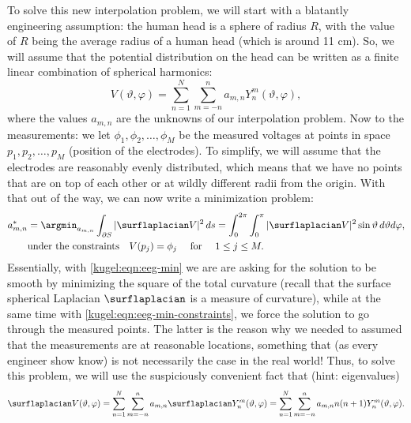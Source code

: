 To solve this new interpolation problem, we will start with a blatantly
engineering assumption: the human head is a sphere of radius $R$, with the value
of $R$ being the average radius of a human head (which is around 11 cm). So, we
will assume that the potential distribution on the head can be written as a
finite linear combination of spherical harmonics:
\begin{equation*}
  V(\vartheta, \varphi)
    = \sum_{n=1}^N \sum_{m=-n}^n a_{m,n} Y^m_n(\vartheta, \varphi),
\end{equation*}
where the values $a_{m,n}$ are the unknowns of our interpolation problem. Now to
the measurements: we let $\phi_1, \phi_2, \ldots, \phi_M$ be the measured voltages
at points in space $p_1, p_2, \ldots, p_M$ (position of the electrodes). To
simplify, we will assume that the electrodes are reasonably evenly distributed,
which means that we have no points that are on top of each other or at wildly
different radii from the origin. With that out of the way, we can now write a
minimization problem:
\begin{subequations}
  \begin{align}
    a_{m,n}^* &= \argmin_{a_{m,n}}
      \int_{\partial S} | \surflaplacian V |^2 \, ds 
      = \int_0^{2\pi} \int_{0}^\pi | \surflaplacian V |^2
        \sin \vartheta \, d\vartheta d\varphi, 
        \label{kugel:eqn:eeg-min} \\
    &\text{under the constraints} \quad V(p_j) = \phi_j
      \quad \text{ for } \quad 1 \leq j \leq M.
      \label{kugel:eqn:eeg-min-constraints}
  \end{align}
\end{subequations}
Essentially, with \eqref{kugel:eqn:eeg-min} we are are asking for the solution
to be smooth by minimizing the square of the total curvature (recall that the
surface spherical Laplacian $\surflaplacian$ is a measure of curvature), while
at the same time with \eqref{kugel:eqn:eeg-min-constraints}, we force the
solution to go through the measured points. The latter is the reason why we
needed to assumed that the measurements are at reasonable locations, something
that (as every engineer show know) is not necessarily the case in the real
world! Thus, to solve this problem, we will use the suspiciously convenient fact
that (hint: eigenvalues)
\begin{equation*}
  \surflaplacian V(\vartheta, \varphi)
    = \sum_{n=1}^N \sum_{m=-n}^n a_{m,n}
      \surflaplacian Y^m_n(\vartheta, \varphi)
    = \sum_{n=1}^N \sum_{m=-n}^n a_{m,n}
      n(n+1) Y^m_n(\vartheta, \varphi).
\end{equation*}
